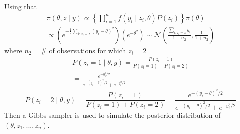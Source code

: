 \documentclass[lecture,12pt,]{pcms-l}
\numberwithin{section}{chapter}
\numberwithin{equation}{chapter}
\theoremstyle{plain}
\theoremstyle{definition}
\theoremstyle{definition}
\begin{document}
\begin{itemize}
\underline{Using that}
\begin{equation*}
\begin{split}
\pi(\theta,z \mid y) \propto \left \{  \prod_{i=1}^n f(y_i \mid z_i, \theta)P(z_i) \right \}\pi(\theta) 
\\
\propto \left ( e^{-\frac{1}{2}\sum_{i:z_i=z}(y_{i}-\theta)^2} \right )\left ( e^{-\theta^2} \right )\sim \mathcal{N}(\frac{\sum_{i:z_i=z} y_{i}}{1+n_2},\frac{1}{1+n_2})
\end{split}
\end{equation*}
where $n_2=\#$ of observations for which $z_i=2$
\begin{equation*}
\begin{split}
P(z_i =1 \mid \theta,y) = \frac{P(z_i =1)}{P(z_i =1 )+P(z_i =2)}
\\
= \frac{e^{-y_{i}^2/2}}{e^{-(y_{i}-\theta)^2/2}+e^{-y_{i}^2/2}}
\end{split}
\end{equation*}
\begin{equation*}
P(z_i =2 \mid \theta,y) = \frac{P(z_i =1)}{P(z_i =1 )+P(z_i =2)}=\frac{e^{-(y_{i}-\theta)^2/2}}{e^{-(y_{i}-\theta)^2/2}+e^{-y_{i}^2/2}}
\end{equation*}
Then a Gibbs sampler is used to simulate the posterior distribution of $(\theta,z_1,...,z_n)$.
\end{itemize}
\end{document}
